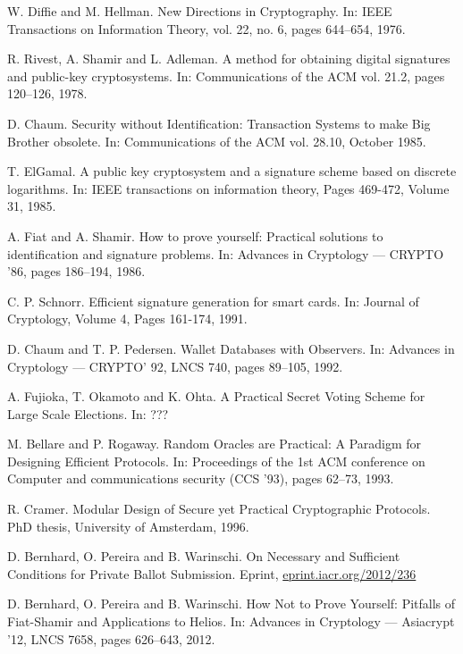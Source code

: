 \documentclass[envcountsame]{llncs}
\begin{document}
\begin{thebibliography}{XXX11}

W. Diffie and M. Hellman.
New Directions in Cryptography.
In: IEEE Transactions on Information Theory, vol. 22, no. 6, pages 644--654, 1976.

R. Rivest, A. Shamir and L. Adleman.
A method for obtaining digital signatures and public-key cryptosystems.
In: Communications of the ACM vol. 21.2, pages 120--126, 1978.

D. Chaum.
Security without Identification: Transaction Systems to make Big Brother obsolete.
In: Communications of the ACM vol. 28.10, October 1985.

T. ElGamal.
A public key cryptosystem and a signature scheme based on discrete logarithms.
In: IEEE transactions on information theory, Pages 469-472, Volume 31, 1985.

A. Fiat and A. Shamir.
How to prove yourself: Practical solutions to identification and signature problems.
In: Advances in Cryptology --- CRYPTO '86, pages 186--194, 1986.

C. P. Schnorr.
Efficient signature generation for smart cards.
In: Journal of Cryptology, Volume 4, Pages 161-174, 1991.

D. Chaum and T. P. Pedersen.
Wallet Databases with Observers.
In: Advances in Cryptology --- CRYPTO' 92, LNCS 740, pages 89--105, 1992.

A. Fujioka, T. Okamoto and K. Ohta.
A Practical Secret Voting Scheme for Large Scale Elections.
In: ???

M. Bellare and P. Rogaway.
Random Oracles are Practical: A Paradigm for Designing Efficient Protocols.
In: Proceedings of the 1st ACM conference on Computer and communications security (CCS '93), pages 62--73, 1993.

R. Cramer.
Modular Design of Secure yet Practical Cryptographic Protocols.
PhD thesis, University of Amsterdam, 1996.

D. Bernhard, O. Pereira and B. Warinschi.
On Necessary and Sufficient Conditions for Private Ballot Submission.
Eprint, \url{eprint.iacr.org/2012/236}

D. Bernhard, O. Pereira and B. Warinschi.
How Not to Prove Yourself: Pitfalls of Fiat-Shamir and Applications to Helios.
In: Advances in Cryptology --- Asiacrypt '12, LNCS 7658, pages 626--643, 2012.


\end{thebibliography}
\end{document}
